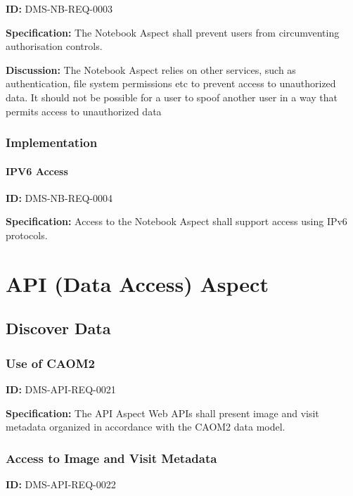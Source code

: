 \documentclass[SE,toc,lsstdraft]{lsstdoc}
\begin{document}
\label{DMS-NB-REQ-0003}
\textbf{ID:} DMS-NB-REQ-0003

\textbf{Specification:}
The Notebook Aspect shall prevent users from circumventing authorisation controls.

\textbf{Discussion:}
The Notebook Aspect relies on other services, such as authentication, file system permissions etc to prevent access to unauthorized data. It should not be possible for a user to spoof another user in a way that permits access to unauthorized data

\subsubsection{Implementation}

\paragraph{IPV6 Access}\hfill  %

\label{DMS-NB-REQ-0004}
\textbf{ID:} DMS-NB-REQ-0004

\textbf{Specification:}
Access to the Notebook Aspect shall support access using IPv6 protocols.

\section{API (Data Access) Aspect}

\subsection{Discover Data}

\subsubsection{Use of CAOM2}

\label{DMS-API-REQ-0021}
\textbf{ID:} DMS-API-REQ-0021

\textbf{Specification:}
The API Aspect Web APIs shall present image and visit metadata organized in accordance with the CAOM2 data model.

\subsubsection{Access to Image and Visit Metadata}

\label{DMS-API-REQ-0022}
\textbf{ID:} DMS-API-REQ-0022
\end{document}
